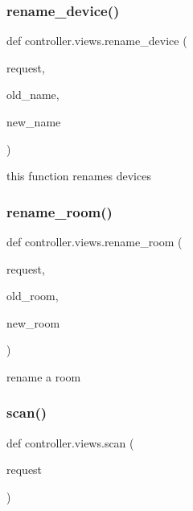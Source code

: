 \subsubsection{\texorpdfstring{rename\+\_\+device()}{rename\_device()}}
{\footnotesize\ttfamily def controller.\+views.\+rename\+\_\+device (\begin{DoxyParamCaption}\item[{}]{request,  }\item[{}]{old\+\_\+name,  }\item[{}]{new\+\_\+name }\end{DoxyParamCaption})}



this function renames devices 

\mbox{\label{namespacecontroller_1_1views_a1b7d046b2086952f35b54e84fbce9b05}} 
\subsubsection{\texorpdfstring{rename\+\_\+room()}{rename\_room()}}
{\footnotesize\ttfamily def controller.\+views.\+rename\+\_\+room (\begin{DoxyParamCaption}\item[{}]{request,  }\item[{}]{old\+\_\+room,  }\item[{}]{new\+\_\+room }\end{DoxyParamCaption})}



rename a room 

\mbox{\label{namespacecontroller_1_1views_ad3c247241bafffa26cf97fab00440668}} 
\subsubsection{\texorpdfstring{scan()}{scan()}}
{\footnotesize\ttfamily def controller.\+views.\+scan (\begin{DoxyParamCaption}\item[{}]{request }\end{DoxyParamCaption})}



